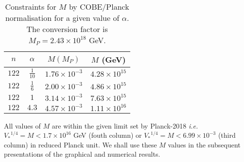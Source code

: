 \documentclass[a4paper,11pt]{article}
\begin{document}
\begin{enumerate}
    \begin{table}[H]
    \captionsetup{justification=centering,width=0.7\textwidth}
    \caption{Constraints for $M$ by COBE/Planck normalisation for a given value of $\alpha$. The conversion factor is $M_P=2.43\times 10^{18}$ GeV.}
    \begin{center}
        \begin{adjustbox}{width=0.45\textwidth}
        \begin{tabular}{|c|c|c|c|}
    \hline
    $n$ & $\alpha$ & $M (M_P)$ & $M$ (GeV)\\
    \hline\hline
    $122$ & $\frac{1}{10}$ & $1.76\times 10^{-3}$ & $4.28\times 10^{15}$\\
    $122$ & $\frac{1}{6}$ & $2.00\times 10^{-3}$ & $4.86\times 10^{15}$\\
    $122$ & $1$ & $3.14\times 10^{-3}$ & $7.63\times 10^{15}$\\
    $122$ & $4.3$ & $4.57\times 10^{-3}$ & $1.11\times 10^{16}$\\
    \hline
    \end{tabular}
    \end{adjustbox}
    \end{center}
         \label{tab:Table1}
    \end{table}
    All values of $M$ are within the given limit set by Planck-2018 \textit{i.e.} ${V_{*}}^{1/4} = M<1.7\times 10^{16}$ GeV (fouth column) or ${V_{*}}^{1/4} = M<6.99\times 10^{-3}$ (third column) in reduced Planck unit. We shall use these $M$ values in the subsequent presentations of the graphical and numerical results. 
\end{enumerate}
\end{document}
